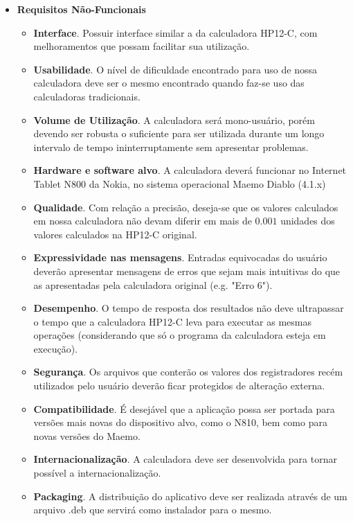 \begin{itemize}
\begin{itemize}
	\end{itemize}
 \item \textbf{Requisitos Não-Funcionais}
	\begin{itemize}
	 \item \textbf{Interface}. Possuir interface similar a da calculadora HP12-C, com melhoramentos que possam facilitar sua utilização.
	 \item \textbf{Usabilidade}. O nível de dificuldade encontrado para uso de nossa calculadora deve ser o mesmo encontrado quando faz-se uso das calculadoras tradicionais.
	 \item \textbf{Volume de Utilização}. A calculadora será mono-usuário, porém devendo ser robusta o suficiente para ser utilizada durante um longo intervalo de tempo ininterruptamente sem apresentar problemas.
	 \item \textbf{Hardware e software alvo}. A calculadora deverá funcionar no Internet Tablet N800 da Nokia, no sistema operacional Maemo Diablo (4.1.x) 
	 \item \textbf{Qualidade}. Com relação a precisão, deseja-se que os valores calculados em nossa calculadora não devam diferir em mais de $0.001$ unidades dos valores calculados na HP12-C original.
	 \item \textbf{Expressividade nas mensagens}. Entradas equivocadas do usuário deverão apresentar mensagens de erros que sejam mais intuitivas do que as apresentadas pela calculadora original (e.g. "Erro 6").
	 \item \textbf{Desempenho}. O tempo de resposta dos resultados não deve ultrapassar o tempo que a calculadora HP12-C leva para executar as mesmas operações (considerando que só o programa da calculadora esteja em execução).
	 \item \textbf{Segurança}. Os arquivos que conterão os valores dos registradores recém utilizados pelo usuário deverão ficar protegidos de alteração externa.
	 \item \textbf{Compatibilidade}. É desejável que a aplicação possa ser portada para versões mais novas do dispositivo alvo, como o N810, bem como para novas versões do Maemo.
	 \item \textbf{Internacionalização}. A calculadora deve ser desenvolvida para tornar possível a internacionalização. 
	 \item \textbf{Packaging}. A distribuição do aplicativo deve ser realizada através de um arquivo .deb que servirá como instalador para o mesmo.
	\end{itemize}
\end{itemize}
